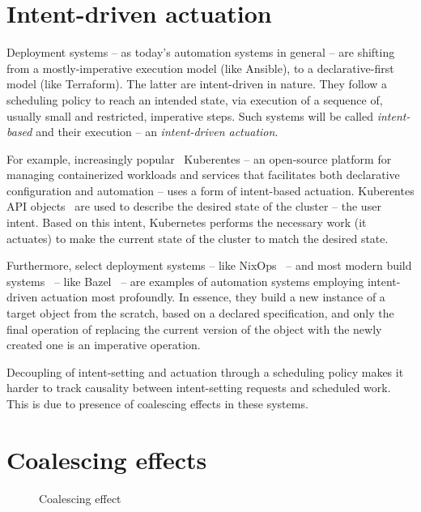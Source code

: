 \section{Intent-driven actuation}\label{sec:intent} 

Deployment systems -- as today's automation systems in general -- are shifting from a mostly-imperative execution model (like Ansible), to a declarative-first model (like Terraform). The latter are intent-driven in nature. They follow a scheduling policy to reach an intended state, via execution of a sequence of, usually small and restricted, imperative steps. Such systems will be called \textit{intent-based} and their execution -- an \textit{intent-driven actuation}.

For example, increasingly popular~\cite{openshift-k8s-trend} Kuberentes -- an open-source platform for managing containerized workloads and services that facilitates both declarative configuration and automation -- uses a form of intent-based actuation. Kuberentes API objects~\cite{k8sObjects2020} are used to describe the desired state of the cluster -- the user intent. Based on this intent, Kubernetes performs the necessary work (it actuates) to make the current state of the cluster to match the desired state.

Furthermore, select deployment systems -- like NixOps~\cite{dolstra2013charon} -- and most modern build systems~\cite{Mokhov2020} -- like Bazel~\cite{bazel-McNerney2020} -- are examples of automation systems employing intent-driven actuation most profoundly. In essence, they build a new instance of a target object from the scratch, based on a declared specification, and only the final operation of replacing the current version of the object with the newly created one is an imperative operation.

Decoupling of intent-setting and actuation through a scheduling policy makes it harder to track causality between intent-setting requests and scheduled work. This is due to presence of coalescing effects in these systems.

\section{Coalescing effects}

\begin{wrapfigure}{r}{0.3\textwidth}
\caption{Coalescing effect}
\label{fig:coalescing-effect}
\end{wrapfigure}

